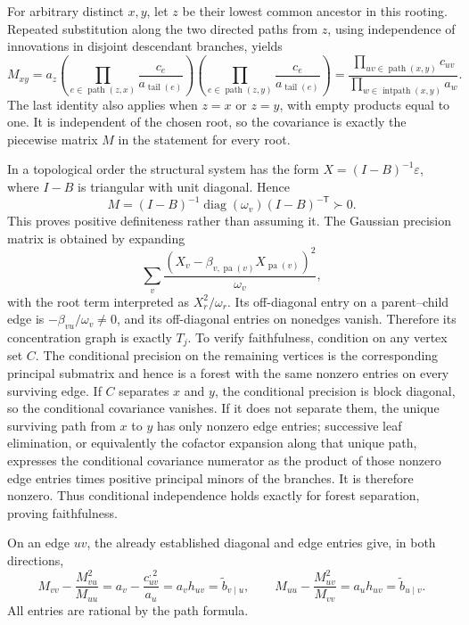 For arbitrary distinct \(x,y\), let \(z\) be their lowest common ancestor in this rooting.  Repeated substitution along the two directed paths from \(z\), using independence of innovations in disjoint descendant branches, yields
\[
 M_{xy}
 =a_z
 \left(\prod_{e\in\operatorname{path}(z,x)}\frac{c_e}{a_{\operatorname{tail}(e)}}\right)
 \left(\prod_{e\in\operatorname{path}(z,y)}\frac{c_e}{a_{\operatorname{tail}(e)}}\right)
 =\frac{\prod_{uv\in\operatorname{path}(x,y)}c_{uv}}
 {\prod_{w\in\operatorname{intpath}(x,y)}a_w}.
\]
The last identity also applies when \(z=x\) or \(z=y\), with empty products equal to one.  It is independent of the chosen root, so the covariance is exactly the piecewise matrix \(M\) in the statement for every root.

In a topological order the structural system has the form \(X=(I-B)^{-1}\varepsilon\), where \(I-B\) is triangular with unit diagonal.  Hence
\[
 M=(I-B)^{-1}\operatorname{diag}(\omega_v)(I-B)^{-\mathsf T}\succ0.
\]
This proves positive definiteness rather than assuming it.  The Gaussian precision matrix is obtained by expanding
\[
 \sum_v\frac{(X_v-\beta_{v,\operatorname{pa}(v)}X_{\operatorname{pa}(v)})^2}{\omega_v},
\]
with the root term interpreted as \(X_r^2/\omega_r\).  Its off-diagonal entry on a parent--child edge is \(-\beta_{vu}/\omega_v\ne0\), and its off-diagonal entries on nonedges vanish.  Therefore its concentration graph is exactly \(T_j\).  To verify faithfulness, condition on any vertex set \(C\).  The conditional precision on the remaining vertices is the corresponding principal submatrix and hence is a forest with the same nonzero entries on every surviving edge.  If \(C\) separates \(x\) and \(y\), the conditional precision is block diagonal, so the conditional covariance vanishes.  If it does not separate them, the unique surviving path from \(x\) to \(y\) has only nonzero edge entries; successive leaf elimination, or equivalently the cofactor expansion along that unique path, expresses the conditional covariance numerator as the product of those nonzero edge entries times positive principal minors of the branches.  It is therefore nonzero.  Thus conditional independence holds exactly for forest separation, proving faithfulness.

On an edge \(uv\), the already established diagonal and edge entries give, in both directions,
\[
 M_{vv}-\frac{M_{vu}^{2}}{M_{uu}}
 =a_v-\frac{c_{uv}^{,2}}{a_u}
 =a_vh_{uv}=\widetilde b_{v\mid u},
\qquad
 M_{uu}-\frac{M_{uv}^{2}}{M_{vv}}
 =a_uh_{uv}=\widetilde b_{u\mid v}.
\]
All entries are rational by the path formula.

